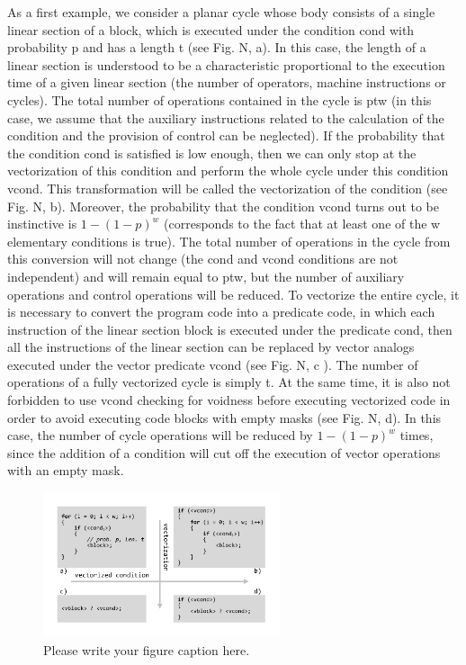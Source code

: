 \documentclass[
11pt,%
tightenlines,%
twoside,%
onecolumn,%
nofloats,%
nobibnotes,%
nofootinbib,%
superscriptaddress,%
noshowpacs,%
centertags]%
{revtex4}
\begin{document}
As a first example, we consider a planar cycle whose body consists of a single linear section of a block, which is executed under the condition cond with probability p and has a length t (see Fig. N, a). In this case, the length of a linear section is understood to be a characteristic proportional to the execution time of a given linear section (the number of operators, machine instructions or cycles). The total number of operations contained in the cycle is ptw (in this case, we assume that the auxiliary instructions related to the calculation of the condition and the provision of control can be neglected). If the probability that the condition cond is satisfied is low enough, then we can only stop at the vectorization of this condition and perform the whole cycle under this condition vcond. This transformation will be called the vectorization of the condition (see Fig. N, b). Moreover, the probability that the condition vcond turns out to be instinctive is $1 - (1 - p) ^ w$ (corresponds to the fact that at least one of the w elementary conditions is true). The total number of operations in the cycle from this conversion will not change (the cond and vcond conditions are not independent) and will remain equal to ptw, but the number of auxiliary operations and control operations will be reduced. To vectorize the entire cycle, it is necessary to convert the program code into a predicate code, in which each instruction of the linear section block is executed under the predicate cond, then all the instructions of the linear section can be replaced by vector analogs executed under the vector predicate vcond (see Fig. N, c ). The number of operations of a fully vectorized cycle is simply t. At the same time, it is also not forbidden to use vcond checking for voidness before executing vectorized code in order to avoid executing code blocks with empty masks (see Fig. N, d). In this case, the number of cycle operations will be reduced by $1 - (1 - p) ^ w$ times, since the addition of a condition will cut off the execution of vector operations with an empty mask.

\begin{figure}[h]
\setcaptionmargin{5mm}
\onelinecaptionstrue  %
\includegraphics[width=0.62\textwidth]{pics/if_vectorization.pdf}
\caption{Please write your figure caption here.}\label{fig:1}
\end{figure}
\end{document}
